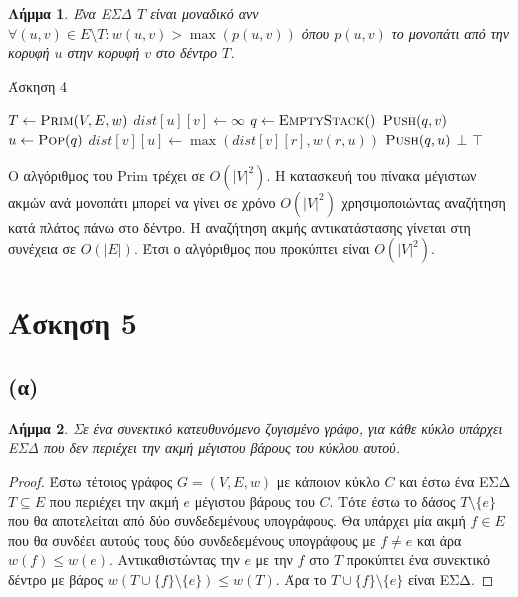 \documentclass[11pt,a4paper,oneside]{report}
\newtheorem*{lemma}{Λήμμα}
\begin{document}
\begin{lemma}
Ένα ΕΣΔ $T$ είναι μοναδικό ανν $\forall (u, v) \in E \setminus T: w( u, v ) > \max(p(u, v))$ όπου $p(u, v)$ το μονοπάτι από την κορυφή $u$ στην κορυφή $v$ στο δέντρο $T$.
\end{lemma}

\begin{algorithm}[H]
\caption{\textgreek{Άσκηση 4}}
\begin{algorithmic}[1]

	\State $T \gets \Call{Prim}{V, E, w}$
		\State $dist[ u ][ v ] \gets \infty$
	\EndFor
		\State $q \gets \Call{EmptyStack}$
		\State $\Call{Push}{q,v}$
			\State $u \gets \Call{Pop}{q}$
					\State $dist[ v ][ u ] \gets \max( dist[ v ][ r ], w( r, u ) )$
					\State $\Call{Push}{q,u}$
				\EndIf
			\EndFor
		\EndWhile
	\EndFor
			\State \Return $\bot$
		\EndIf
	\EndFor
	\State \Return $\top$
\EndProcedure
\end{algorithmic}
\end{algorithm}

Ο αλγόριθμος του \textlatin{Prim} τρέχει σε $O( |V|^2 )$. Η κατασκευή του πίνακα μέγιστων ακμών ανά μονοπάτι μπορεί να γίνει σε χρόνο $O( |V|^2 )$ χρησιμοποιώντας αναζήτηση κατά πλάτος πάνω στο δέντρο. Η αναζήτηση ακμής αντικατάστασης γίνεται στη συνέχεια σε $O( |E| )$. Έτσι ο αλγόριθμος που προκύπτει είναι $O( |V|^2 )$.

\section*{Άσκηση 5}
\subsection*{(α)}
\begin{lemma}
Σε ένα συνεκτικό κατευθυνόμενο ζυγισμένο γράφο, για κάθε κύκλο υπάρχει ΕΣΔ που δεν περιέχει την ακμή μέγιστου βάρους του κύκλου αυτού.
\end{lemma}

\begin{proof}
Έστω τέτοιος γράφος $G = (V, E, w)$ με κάποιον κύκλο $C$ και έστω ένα ΕΣΔ $T \subseteq E$ που περιέχει την ακμή $e$ μέγιστου βάρους του $C$. Τότε έστω το δάσος $T \setminus \{ e \}$ που θα αποτελείται από δύο συνδεδεμένους υπογράφους. Θα υπάρχει μία ακμή $f \in E$ που θα συνδέει αυτούς τους δύο συνδεδεμένους υπογράφους με $f \neq e$ και άρα $w( f ) \leq w( e )$. Αντικαθιστώντας την $e$ με την $f$ στο $T$ προκύπτει ένα συνεκτικό δέντρο με βάρος $w( T \cup \{ f \} \setminus \{ e \} ) \leq w( T )$. Άρα το $T \cup \{ f \} \setminus \{ e \}$ είναι ΕΣΔ.
\end{proof}
\end{document}
